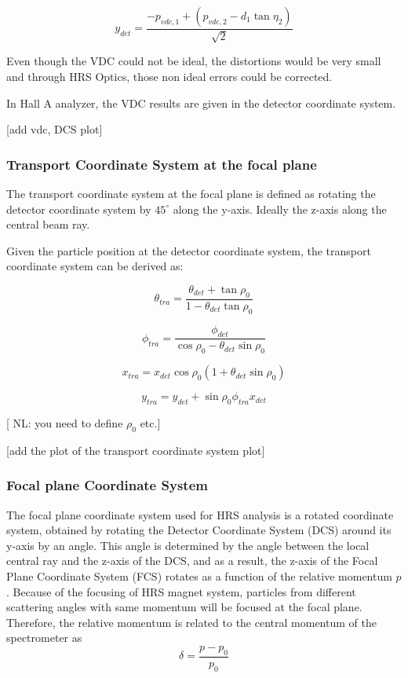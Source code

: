 \begin{equation}
    y_{det} = \frac{-p_{vdc,1} + (p_{vdc,2} - d_1\tan{\eta_2})}{\sqrt{2}}
\end{equation}

Even though the VDC could not be ideal, the distortions would be very small and through HRS Optics, those non ideal errors could be corrected. 

In Hall A analyzer, the VDC results  are  given in the detector  coordinate system.

[add vdc, DCS plot]

\subsubsection{Transport  Coordinate System at the focal plane}
The transport coordinate system at the focal plane is defined as rotating the detector coordinate system by $45^{\circ}$ along the y-axis. Ideally the z-axis along the central beam ray. 

Given the particle position at the detector coordinate system, the transport coordinate system can be derived as:

\begin{equation}
    \theta_{tra}  = \frac{\theta_{det} + \tan{\rho_0}}{1 - \theta_{det}\tan{\rho_0}} 
\end{equation}

\begin{equation}
    \phi_{tra} = \frac{\phi_{det}}{\cos{\rho_0} - \theta_{det}\sin{\rho_0}}
\end{equation}

\begin{equation}
    x_{tra} = x_{det}\cos{\rho_0}(1 + \theta_{det}\sin{\rho_0})
\end{equation}

\begin{equation}
    y_{tra} = y_{det} + \sin{\rho_0}\phi_{tra}x_{det}
\end{equation}

[ NL: you need to define $\rho_0$ etc.]

[add the plot of the transport coordinate system plot]


\subsubsection{Focal plane Coordinate System}

The focal plane coordinate system used for HRS analysis is a rotated coordinate system, obtained by rotating the Detector Coordinate System (DCS) around its y-axis by an angle. This angle is determined by the angle between the local central ray and the z-axis of the DCS, and as a result, the z-axis of the Focal Plane Coordinate System (FCS) rotates as a function of the relative momentum $p$. Because of the focusing of HRS magnet system,  particles from different scattering angles with same momentum will be focused at the focal plane. Therefore, the relative momentum is related to the central momentum of the spectrometer  as 
\begin{equation}
    \delta = \frac{p-p_0}{p_0}
\end{equation}

